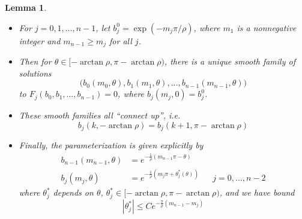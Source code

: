 \documentclass[12pt]{article}
\newtheorem{lemma}{Lemma}
\begin{document}
\begin{lemma}\label{thetaparam}\[\]
\begin{itemize}
\item For $j = 0, 1, \dots, n-1$, let $b_j^0 = \exp(-m_j \pi / \rho )$, where $m_1$ is a nonnegative integer and $m_{n-1} \geq m_j$ for all $j$. 
\item Then for $\theta \in [-\arctan \rho,\pi - \arctan \rho)$, there is a unique smooth family of solutions 
\[
\Big( b_0(m_0, \theta), b_1(m_1, \theta), \dots, b_{n-1}(m_{n-1}, \theta) \Big)
\]
 to $F_j(b_0, b_1, \dots, b_{n-1}) = 0$, where $b_j(m_j, 0) = b_j^0$.

\item These smooth families all ``connect up'', i.e.
\[
b_j(k, -\arctan \rho) = b_j(k+1, \pi - \arctan \rho)
\]
\item Finally, the parameterization is given explicitly by
\begin{align*}
b_{n-1}(m_{n-1}, \theta) &= e^{ -\frac{1}{\rho}(m_{n-1} \pi - \theta) } \\
b_j(m_j, \theta) &= e^{-\frac{1}{\rho} (m_j \pi + \theta^*_j(\theta)) } && j = 0, \dots, n-2
\end{align*}
where $\theta^*_j$ depends on $\theta$, $\theta_j^* \in [-\arctan \rho,\pi - \arctan \rho)$, and we have bound
\[
|\theta^*_j| \leq C e^{ -\frac{\pi}{\rho} (m_{n-1} - m_j) }
\]
\end{itemize}
\end{lemma}
\end{document}

